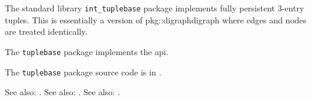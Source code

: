 
The standard library {\tt int\_tuplebase} package implements fully persistent 3-entry tuples.  This is essentially a version of {pkg::digraph}{digraph} where edges and nodes are treated identically.

The {\tt tuplebase} package implements the  api.

The {\tt tuplebase} package source code is in .

See also:  .
See also:  .
See also:  .



